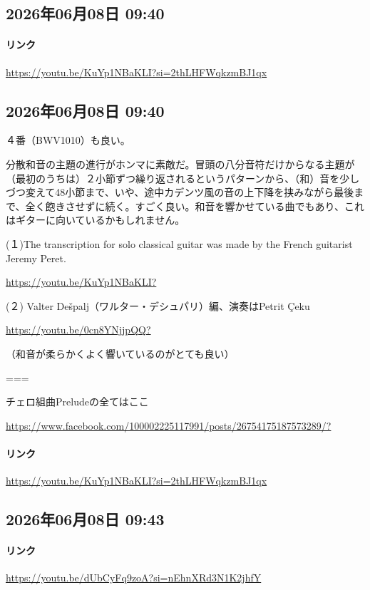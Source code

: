 \subsection*{2026年06月08日 09:40}

\paragraph{リンク}
\url{https://youtu.be/KuYp1NBaKLI?si=2thLHFWqkzmBJ1qx}

\subsection*{2026年06月08日 09:40}

４番（BWV1010）も良い。

分散和音の主題の進行がホンマに素敵だ。冒頭の八分音符だけからなる主題が（最初のうちは）２小節ずつ繰り返されるというパターンから、（和）音を少しづつ変えて48小節まで、いや、途中カデンツ風の音の上下降を挟みながら最後まで、全く飽きさせずに続く。すごく良い。和音を響かせている曲でもあり、これはギターに向いているかもしれません。

(１)The transcription for solo classical guitar was made by the French guitarist Jeremy Peret.

\url{https://youtu.be/KuYp1NBaKLI?}

(２) Valter Dešpalj（ワルター・デシュパリ）編、演奏はPetrit Çeku

\url{https://youtu.be/0cn8YNjjpQQ?}

（和音が柔らかくよく響いているのがとても良い）

===

チェロ組曲Preludeの全てはここ

\url{https://www.facebook.com/100002225117991/posts/26754175187573289/?}

\paragraph{リンク}
\url{https://youtu.be/KuYp1NBaKLI?si=2thLHFWqkzmBJ1qx}

\subsection*{2026年06月08日 09:43}

\paragraph{リンク}
\url{https://youtu.be/dUbCyFq9zoA?si=nEhnXRd3N1K2jhfY}

